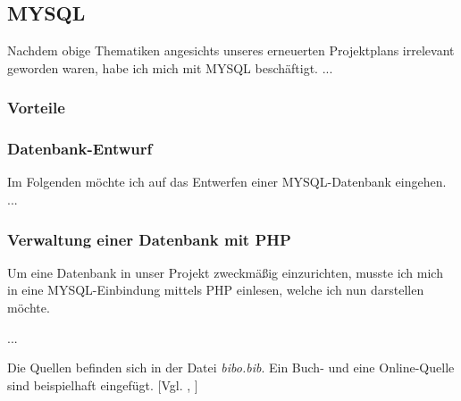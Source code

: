 \documentclass[12pt,a4paper,bibliography=totocnumbered,listof=totocnumbered]{scrartcl}
\begin{document}
\pagebreak
\subsection{MYSQL}
Nachdem obige Thematiken angesichts unseres erneuerten Projektplans irrelevant geworden waren, habe ich mich 
mit MYSQL beschäftigt.
...

\subsubsection{Vorteile}

\subsubsection{Datenbank-Entwurf}
Im Folgenden möchte ich auf das Entwerfen einer MYSQL-Datenbank eingehen.
...



\subsubsection{Verwaltung einer Datenbank mit PHP}
Um eine Datenbank in unser Projekt zweckmäßig einzurichten, musste ich mich in eine MYSQL-Einbindung mittels PHP einlesen, welche ich nun darstellen möchte.

...

Die Quellen befinden sich in der Datei \textit{bibo.bib}. Ein Buch- und eine Online-Quelle sind beispielhaft eingefügt. [Vgl. \cite{buch}, \cite{online}]

\pagebreak

\end{document}
